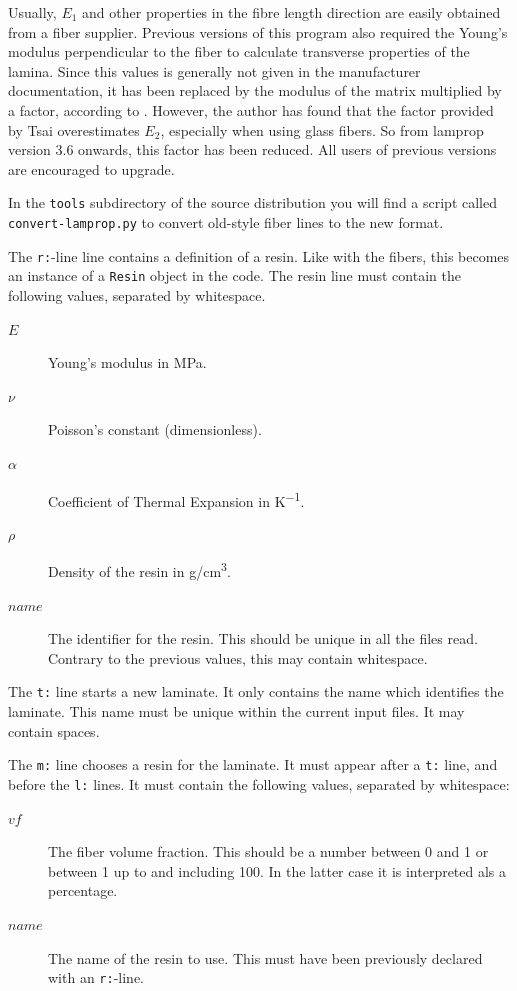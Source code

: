 \documentclass[a4paper,landscape,oneside,11pt,twocolumn]{memoir}
\begin{document}
Usually, $E_1$ and other properties in the fibre length direction are easily
obtained from a fiber supplier. Previous versions of this program also
required the Young's modulus perpendicular to the fiber to calculate
transverse properties of the lamina. Since this values is generally not given
in the manufacturer documentation, it has been replaced by the modulus of the
matrix multiplied by a factor, according to \citet{Tsai:1992}. However, the
author has found that the factor provided by Tsai overestimates $E_2$,
especially when using glass fibers. So from lamprop version 3.6 onwards, this
factor has been reduced. All users of previous versions are encouraged to
upgrade.

In the \texttt{tools} subdirectory of the source distribution you will find
a script called \texttt{convert-lamprop.py} to convert old-style fiber lines
to the new format.

The \texttt{r:}-line line contains a definition of a resin. Like with the
fibers, this becomes an instance of a \texttt{Resin} object in the code. The
resin line must contain the following values, separated by whitespace.
\begin{description}
    \item[$E$] Young's modulus in \si{MPa}.
    \item[$\nu$] Poisson's constant (dimensionless).
    \item[$\alpha$] Coefficient of Thermal Expansion in \si{K^{-1}}.
    \item[$\rho$] Density of the resin in \si{g/cm^3}.
    \item[$name$] The identifier for the resin. This should be unique in all
        the files read. Contrary to the previous values, this may contain
        whitespace.
\end{description}

The \texttt{t:} line starts a new laminate. It only contains the name which
identifies the laminate. This name must be unique within the current input
files. It may contain spaces.

The \texttt{m:} line chooses a resin for the laminate. It must appear after
a \texttt{t:} line, and before the \texttt{l:} lines. It must contain the
following values, separated by whitespace:
\begin{description}
    \item[$vf$] The fiber volume fraction. This should be a number between
        0 and 1 or between 1 up to and including 100. In the latter case it
        is interpreted als a percentage.
    \item[$name$] The name of the resin to use. This must have been previously
        declared with an \texttt{r:}-line.
\end{description}
\end{document}
